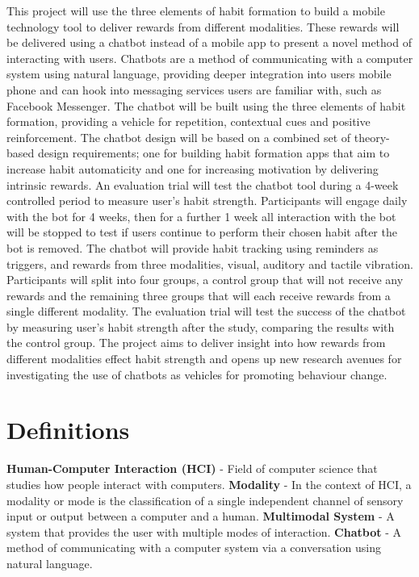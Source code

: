 \newline
This project will use the three elements of habit formation to build a mobile technology tool to deliver rewards from different modalities. These rewards will be delivered using a chatbot instead of a mobile app to present a novel method of interacting with users. Chatbots are a method of communicating with a computer system using natural language, providing deeper integration into users mobile phone and can hook into messaging services users are familiar with, such as Facebook Messenger. The chatbot will be built using the three elements of habit formation, providing a vehicle for repetition, contextual cues and positive reinforcement. The chatbot design will be based on a combined set of theory-based design requirements; one for building habit formation apps that aim to increase habit automaticity and one for increasing motivation by delivering intrinsic rewards.\newline
\newline
An evaluation trial will test the chatbot tool during a 4-week controlled period to measure user's habit strength. Participants will engage daily with the bot for 4 weeks, then for a further 1 week all interaction with the bot will be stopped to test if users continue to perform their chosen habit after the bot is removed. The chatbot will provide habit tracking using reminders as triggers, and rewards from three modalities, visual, auditory and tactile vibration. Participants will split into four groups, a control group that will not receive any rewards and the remaining three groups that will each receive rewards from a single different modality. The evaluation trial will test the success of the chatbot by measuring user's habit strength after the study, comparing the results with the control group.\newline
\newline
The project aims to deliver insight into how rewards from different modalities effect habit strength and opens up new research avenues for investigating the use of chatbots as vehicles for promoting behaviour change.
\newpage

\section*{Definitions}

\textbf{Human-Computer Interaction (HCI)} - Field of computer science that studies how people interact with computers.\newline
\newline
\textbf{Modality} - In the context of HCI, a modality or mode is the classification of a single independent channel of sensory input or output between a computer and a human.\newline
\newline
\textbf{Multimodal System} - A system that provides the user with multiple modes of interaction.\newline
\newline
\textbf{Chatbot} - A method of communicating with a computer system via a conversation using natural language.

\newpage
